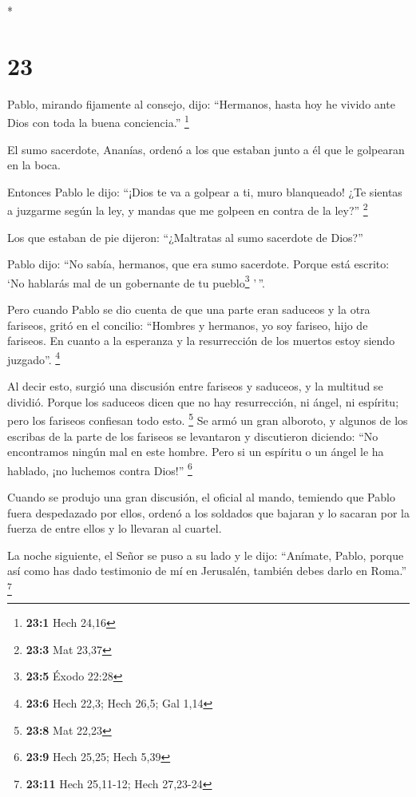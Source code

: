 \begin{paracol}{2}
\switchcolumn[0]*

\hypertarget{section-44}{%
\section{23}\label{section-44}}

 Pablo, mirando fijamente al consejo, dijo: ``Hermanos,
hasta hoy he vivido ante Dios con toda la buena conciencia.''
\footnote{\textbf{23:1} Hech 24,16}

 El sumo sacerdote, Ananías, ordenó a los que estaban
junto a él que le golpearan en la boca.

 Entonces Pablo le dijo: ``¡Dios te va a golpear a ti,
muro blanqueado! ¿Te sientas a juzgarme según la ley, y mandas que me
golpeen en contra de la ley?'' \footnote{\textbf{23:3} Mat 23,37}

 Los que estaban de pie dijeron: ``¿Maltratas al sumo
sacerdote de Dios?''

 Pablo dijo: ``No sabía, hermanos, que era sumo sacerdote.
Porque está escrito: `No hablarás mal de un gobernante de tu
pueblo\footnote{\textbf{23:5} Éxodo 22:28} '\,''.

 Pero cuando Pablo se dio cuenta de que una parte eran
saduceos y la otra fariseos, gritó en el concilio: ``Hombres y hermanos,
yo soy fariseo, hijo de fariseos. En cuanto a la esperanza y la
resurrección de los muertos estoy siendo juzgado''. \footnote{\textbf{23:6}
  Hech 22,3; Hech 26,5; Gal 1,14}

 Al decir esto, surgió una discusión entre fariseos y
saduceos, y la multitud se dividió.  Porque los saduceos
dicen que no hay resurrección, ni ángel, ni espíritu; pero los fariseos
confiesan todo esto. \footnote{\textbf{23:8} Mat 22,23} 
Se armó un gran alboroto, y algunos de los escribas de la parte de los
fariseos se levantaron y discutieron diciendo: ``No encontramos ningún
mal en este hombre. Pero si un espíritu o un ángel le ha hablado, ¡no
luchemos contra Dios!'' \footnote{\textbf{23:9} Hech 25,25; Hech 5,39}

 Cuando se produjo una gran discusión, el oficial al
mando, temiendo que Pablo fuera despedazado por ellos, ordenó a los
soldados que bajaran y lo sacaran por la fuerza de entre ellos y lo
llevaran al cuartel.

 La noche siguiente, el Señor se puso a su lado y le
dijo: ``Anímate, Pablo, porque así como has dado testimonio de mí en
Jerusalén, también debes darlo en Roma.'' \footnote{\textbf{23:11} Hech
  25,11-12; Hech 27,23-24}


\end{paracol}

